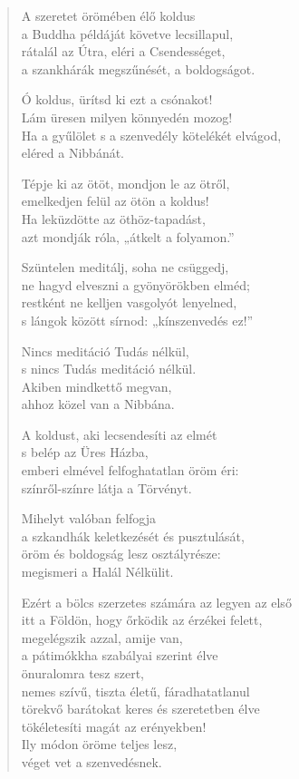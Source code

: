 \begin{verse}
 A szeretet örömében élő koldus\\
a Buddha példáját követve lecsillapul,\\
rátalál az Útra, eléri a Csendességet,\\
a szankhárák megszűnését, a boldogságot.

 Ó koldus, ürítsd ki ezt a csónakot!\\
Lám üresen milyen könnyedén mozog!\\
Ha a gyűlölet s a szenvedély kötelékét elvágod,\\
eléred a Nibbánát.

 Tépje ki az ötöt, mondjon le az ötről,\\
emelkedjen felül az ötön a koldus!\\
Ha leküzdötte az öthöz-tapadást,\\
azt mondják róla, „átkelt a folyamon.”

 Szüntelen meditálj, soha ne csüggedj,\\
ne hagyd elveszni a gyönyörökben elméd;\\
restként ne kelljen vasgolyót lenyelned,\\
s lángok között sírnod: „kínszenvedés ez!”

 Nincs meditáció Tudás nélkül,\\
s nincs Tudás meditáció nélkül.\\
Akiben mindkettő megvan,\\
ahhoz közel van a Nibbána.

 A koldust, aki lecsendesíti az elmét\\
s belép az Üres Házba,\\
emberi elmével felfoghatatlan öröm éri:\\
színről-színre látja a Törvényt.

 Mihelyt valóban felfogja\\
a szkandhák keletkezését és pusztulását,\\
öröm és boldogság lesz osztályrésze:\\
megismeri a Halál Nélkülit.

 Ezért a bölcs szerzetes számára az legyen az első\\
itt a Földön, hogy őrködik az érzékei felett,\\
megelégszik azzal, amije van,\\
a pátimókkha szabályai szerint élve\\
önuralomra tesz szert,\\
nemes szívű, tiszta életű, fáradhatatlanul\\
törekvő barátokat keres és szeretetben élve\\
tökéletesíti magát az erényekben!\\
Ily módon öröme teljes lesz,\\
véget vet a szenvedésnek.


\end{verse}
